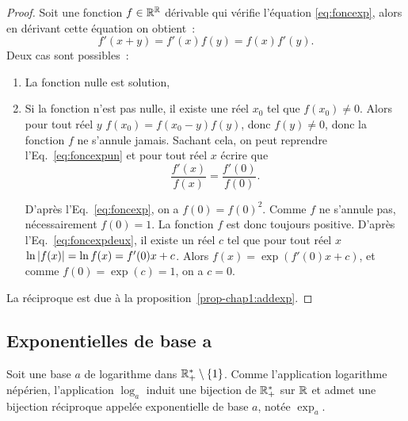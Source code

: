 \begin{proof}
    Soit une fonction \(f \in \mathbb{R}^{\mathbb{R}}\) dérivable qui vérifie l'équation 
    \eqref{eq:foncexp}, alors en dérivant cette équation on obtient~:
    \begin{equation}
        \label{eq:foncexpun}
        f'(x+y) = f'(x)f(y) = f(x)f'(y).
    \end{equation}
    Deux cas sont possibles~:
    \begin{enumerate}
        \item La fonction nulle est solution,
        \item Si la fonction n'est pas nulle, il existe une réel \(x_0\) tel 
            que \(f(x_0) \neq 0\). Alors pour tout réel \(y\) \(f(x_0)= 
            f(x_0-y)f(y)\), donc \(f(y) \neq 0\), donc la fonction \(f\) ne 
            s'annule jamais. Sachant cela, on peut reprendre 
            l'Eq.~\eqref{eq:foncexpun} et pour tout réel \(x\) écrire que           
            \begin{equation}
                \label{eq:foncexpdeux}
                \frac{f'(x)}{f(x)} = \frac{f'(0)}{f(0)}.
            \end{equation}
            
            D'après l'Eq.~\eqref{eq:foncexp}, on a \(f(0) = f(0)^2\).
            Comme \(f\) ne s'annule pas, nécessairement \(f(0) = 1\). La 
            fonction \(f\) est donc toujours positive. D'après 
            l'Eq.~\eqref{eq:foncexpdeux}, il existe un réel \(c\) tel 
            que pour tout réel \(x\) \(\ln \left\lvert f(x)\right\rvert = \ln f(x) = f'(0) x + 
            c\). Alors \(f(x) = \exp(f'(0) x +c)\), et comme \(f(0) = \exp(c) = 
            1\), on a \(c = 0\).
    \end{enumerate}

    La réciproque est due à la proposition~\ref{prop-chap1:addexp}.
\end{proof}

\subsection{Exponentielles de base a}
\label{subsec:chap1-expa}

\begin{defdef}
    Soit une base \(a\) de logarithme dans \(\mathbb{R}_{+}^{*}\setminus\{1\}\). 
    Comme l'application logarithme népérien, l'application \(\log_a\) induit 
    une bijection de \(\mathbb{R}_{+}^{*}\) sur \(\mathbb{R}\) et admet une bijection 
    réciproque appelée exponentielle de base \(a\), notée \(\exp_a\).
\end{defdef}

